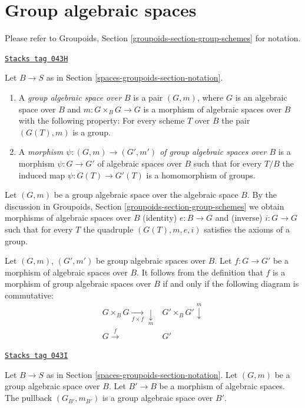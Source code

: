 \section{Group algebraic spaces}
\label{spaces-groupoids-section-group-spaces}
Please refer to
Groupoids, Section \ref{groupoids-section-group-schemes}
for notation.

\begin{definition}
\label{spaces-groupoids-definition-group-space}
\href{https://stacks.math.columbia.edu/tag/043H}{\texttt{Stacks tag 043H}}

Let $B \to S$ as in Section \ref{spaces-groupoids-section-notation}.
\begin{enumerate}
\item A {\it group algebraic space over $B$} is a pair $(G, m)$, where
$G$ is an algebraic space over $B$ and $m : G \times_B G \to G$ is
a morphism of algebraic spaces over $B$ with the following property:
For every scheme $T$ over $B$ the pair $(G(T), m)$ is a group.
\item A {\it morphism $\psi : (G, m) \to (G', m')$ of
group algebraic spaces over $B$}
is a morphism $\psi : G \to G'$ of algebraic spaces over $B$ such that for
every $T/B$ the induced map $\psi : G(T) \to G'(T)$ is a homomorphism
of groups.
\end{enumerate}
\end{definition}

Let $(G, m)$ be a group algebraic space over the algebraic space $B$.
By the discussion in
Groupoids, Section \ref{groupoids-section-group-schemes}
we obtain morphisms of algebraic spaces over $B$
(identity) $e : B \to G$ and (inverse) $i : G \to G$ such that
for every $T$ the quadruple $(G(T), m, e, i)$ satisfies the
axioms of a group.

\medskip\noindent
Let $(G, m)$, $(G', m')$ be group algebraic spaces over $B$.
Let $f : G \to G'$ be a morphism of algebraic spaces over $B$.
It follows from the definition that $f$ is a morphism
of group algebraic spaces over $B$ if and only if the following diagram
is commutative:
$$
\begin{array}{cc}G \times_B G \underset{f \times f}{\longrightarrow}\underset{m}{\downarrow} & G' \times_B G' \overset{m}{\downarrow} \\ G \overset{f}{\longrightarrow} & G'\end{array}
$$

\begin{lemma}
\label{spaces-groupoids-lemma-base-change-group-space}
\href{https://stacks.math.columbia.edu/tag/043I}{\texttt{Stacks tag 043I}}

Let $B \to S$ as in Section \ref{spaces-groupoids-section-notation}.
Let $(G, m)$ be a group algebraic space over $B$.
Let $B' \to B$ be a morphism of algebraic spaces.
The pullback $(G_{B'}, m_{B'})$ is a group algebraic space over $B'$.
\end{lemma}

